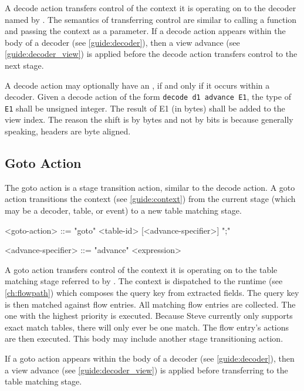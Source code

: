 A decode action transfers control of the context it is operating on to the decoder named by . The semantics of transferring control are similar to calling a function and passing the context as a parameter. If a decode action appears within the body of a decoder (see \ref{guide:decoder}), then a view advance (see \ref{guide:decoder_view}) is applied before the decode action transfers control to the next stage.

A decode action may optionally have an , if and only if it occurs within a decoder. Given a decode action of the form \texttt{decode d1 advance E1}, the type of \texttt{E1} shall be unsigned integer. The result of E1 (in bytes) shall be added to the view index. The reason the shift is by bytes and not by bits is because generally speaking, headers are byte aligned.

\subsection{Goto Action} \label{guide:goto}

The goto action is a stage transition action, similar to the decode action. A goto action transitions the context (see \ref{guide:context}) from the current stage (which may be a decoder, table, or event) to a new table matching stage.

\begin{minip}
\begin{grammar}
<goto-action> ::=
"goto" <table-id> [<advance-specifier>] ";"

<advance-specifier> ::= "advance" <expression>
\end{grammar}
\end{minip}

A goto action transfers control of the context it is operating on to the table matching stage referred to by . The context is dispatched to the runtime (see \ref{ch:flowpath}) which composes the query key from extracted fields. The query key is then matched against flow entries. All matching flow entries are collected. The one with the highest priority is executed. Because Steve currently only supports exact match tables, there will only ever be one match. The flow entry's actions are then executed. This body may include another stage transitioning action.

If a goto action appears within the body of a decoder (see \ref{guide:decoder}), then a view advance (see \ref{guide:decoder_view}) is applied before transferring to the table matching stage.

